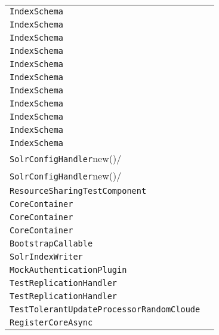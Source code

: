 \begin{center}
\begin{tabular}{ll}
\lstinline/IndexSchema/&\raisebox{0pt}{\lstinline/new()/}\\
\lstinline/IndexSchema/&\raisebox{0pt}{\lstinline/new()/}\\
\lstinline/IndexSchema/&\raisebox{0pt}{\lstinline/new()/}\\
\lstinline/IndexSchema/&\raisebox{0pt}{\lstinline/new()/}\\
\lstinline/IndexSchema/&\raisebox{0pt}{\lstinline/new()/}\\
\lstinline/IndexSchema/&\raisebox{0pt}{\lstinline/new()/}\\
\lstinline/IndexSchema/&\raisebox{0pt}{\lstinline/new()/}\\
\lstinline/IndexSchema/&\raisebox{0pt}{\lstinline/new()/}\\
\lstinline/IndexSchema/&\raisebox{0pt}{\lstinline/new()/}\\
\lstinline/IndexSchema/&\raisebox{0pt}{\lstinline/new()/}\\
\lstinline/IndexSchema/&\raisebox{0pt}{\lstinline/new()/}\\
\lstinline/SolrConfigHandler/new()/&\raisebox{0pt}{\lstinline/wait()/}\\
\lstinline/SolrConfigHandler/new()/&\raisebox{0pt}{\lstinline/wait()/}\\
\lstinline/ResourceSharingTestComponent/&\raisebox{0pt}{\lstinline/inform(SolrCorecore)/}\\
\lstinline/CoreContainer/&\raisebox{0pt}{\lstinline/swap(Stringn0,Stringn1)/}\\
\lstinline/CoreContainer/&\raisebox{0pt}{\lstinline/swap(Stringn0,Stringn1)/}\\
\lstinline/CoreContainer/&\raisebox{0pt}{\lstinline/swap(Stringn0,Stringn1)/}\\
\lstinline/BootstrapCallable/&\raisebox{0pt}{\lstinline/call()/}\\
\lstinline/SolrIndexWriter/&\raisebox{0pt}{\lstinline/rollback()/}\\
\lstinline/MockAuthenticationPlugin/&\raisebox{0pt}{\lstinline/doAuthenticate(ServletRequest)/}\\
\lstinline/TestReplicationHandler/&\raisebox{0pt}{\lstinline/RateLimitedReplication()/}\\
\lstinline/TestReplicationHandler/&\raisebox{0pt}{\lstinline/RateLimitedReplication()/}\\
\lstinline/TestTolerantUpdateProcessorRandomCloude/&\raisebox{0pt}{\lstinline/createMiniSolrCloudCluster()/}\\
\lstinline/RegisterCoreAsync/&\raisebox{0pt}{\lstinline/Objectcall()/}\\

\end{tabular}
\end{center}

